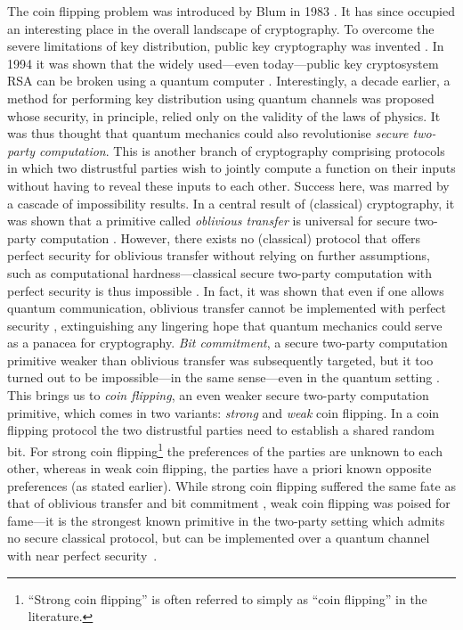 \documentclass{theoretics}
\begin{document}
%
The coin flipping problem was introduced by Blum in 1983 \cite{Blum:1983:CFT:1008908.1008911}. It has since occupied an interesting place in the overall landscape
of cryptography. To overcome the severe limitations of key distribution, public key cryptography was invented \cite{DH,Merkel}. In 1994 it was shown that the widely used---even today---public key cryptosystem RSA \cite{RSA} can be broken using a quantum computer \cite{Shora}.
Interestingly, a decade earlier, a method for performing key distribution using quantum channels
\cite{BB84} was proposed whose security, in principle, relied only
on the validity of the laws of physics. It was thus thought that quantum mechanics could also revolutionise
\emph{secure two-party computation}. This is another branch of cryptography comprising protocols in which two distrustful parties wish to jointly compute a function on their inputs without having to reveal these inputs to each other. Success here, was marred by a cascade of impossibility results. In a central result of (classical) cryptography, it was shown that a primitive called \emph{oblivious transfer} is universal for secure two-party computation \cite{Kilian}. However, there exists no (classical) protocol that offers perfect security for oblivious transfer without relying on further assumptions,
such as computational hardness---classical secure two-party computation with perfect security is thus impossible \cite{Colbeck07}. In fact, it was shown that even if one allows quantum communication, oblivious transfer cannot be implemented with perfect security \cite{Lo97,CKS13}, extinguishing any lingering hope that quantum mechanics could serve as a panacea for cryptography.
%
%
%
%
%
%
\emph{Bit commitment}, a secure two-party computation primitive weaker than oblivious transfer was subsequently targeted, but it too turned out to be impossible---in the same sense---even in the quantum setting \cite{CK11}. This brings us to \emph{coin flipping}, an even weaker secure two-party computation primitive, which comes in two variants: \emph{strong} and \emph{weak} coin flipping. In a coin flipping protocol the two distrustful parties need to establish a shared random bit. For strong coin flipping\footnote{``Strong coin flipping'' is often referred to simply as ``coin flipping'' in the literature.} the preferences of the parties are unknown to each other, whereas in weak coin flipping, the parties have a priori known opposite preferences (as stated earlier).
While strong coin flipping suffered the same fate as that of oblivious transfer and bit commitment \cite{CK09}, weak coin flipping was poised
for fame---it is the strongest known primitive in the two-party
setting which admits no secure classical protocol, but can be implemented
over a quantum channel with near perfect security~\cite{Mochon07}.
%
\end{document}
